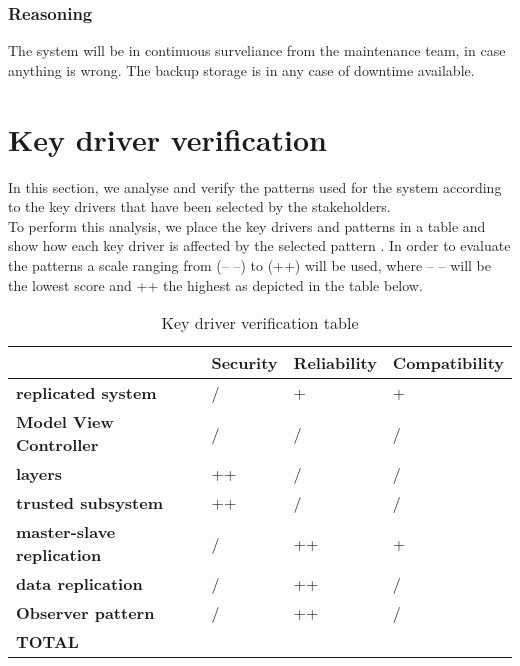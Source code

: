 \subsubsection{Reasoning}

The system will be in continuous surveliance from the maintenance team, in case anything is wrong. The backup storage is in any case of downtime available. 
\newpage


\section{Key driver verification}
In this section, we analyse and verify the patterns used for the system according to the key drivers that have been selected by the stakeholders.\\
To perform this analysis, we place the key drivers and patterns in a table and show how each key driver is affected by the selected pattern \cite{web:patterns-v-QAs} .  In order to evaluate the patterns a scale ranging from (-- --) to (++) will be used, where -- -- will be the lowest score and ++ the highest as depicted in the table below. 

\begin{table}[H]
    \begin{tabularx}{\textwidth}{p{3.5cm}|>{\centering\arraybackslash}X|>{\centering\arraybackslash}X|>{\centering\arraybackslash}X}
    	 & \textbf{Security} & \textbf{Reliability} & \textbf{Compatibility} \\ \hline
    	\textbf{replicated system}         & /  & +  & + \\ \hline
    	\textbf{Model View Controller}  & /  & / & /  \\ \hline
    	\textbf{layers}                    & ++ & /  &  / \\ \hline
    	\textbf{trusted subsystem}         & ++ & /  &  / \\ \hline
    	\textbf{master-slave replication}  & /  & ++ & +  \\ \hline
	\textbf{data replication}  &  / & ++ & /  \\ \hline
	\textbf{Observer pattern}  &  / & ++ &  / \\ \hline
	 \textbf{TOTAL} & \textbf{} & \textbf{} & \textbf{} \\
    \end{tabularx}
    \caption{Key driver verification table}
\end{table}
